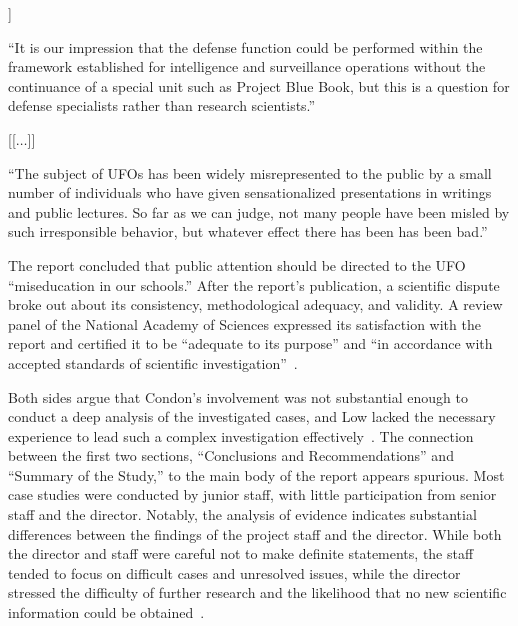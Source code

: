 \begin{svgraybox}
[[$\ldots$]]

``It is our impression that the defense function could be performed within the framework
established for intelligence and surveillance operations without the continuance of a special unit such as Project Blue Book,
but this is a question for defense specialists rather than research scientists.''



[[$\ldots$]]

``The subject of UFOs has been widely misrepresented to the public by a small number of individuals who have given sensationalized presentations
in writings and public lectures.
So far as we can judge, not many people have been misled by such irresponsible behavior,
but whatever effect there has been has been bad.''
\end{svgraybox}

The report concluded that public attention should be directed to the UFO ``miseducation in our schools.'' After the report's publication, a scientific dispute broke out about its consistency, methodological adequacy, and validity. A review panel of the National Academy of Sciences expressed its satisfaction with the report and certified it to be ``adequate to its purpose'' and ``in accordance with accepted standards of scientific investigation''~\cite{PNAS-Condon-1969}.

Both sides argue that Condon's involvement was not substantial enough to conduct a deep analysis of the investigated cases, and Low lacked the necessary experience to lead such a complex investigation effectively~\cite{Klass2019Apr}. The connection between the first two sections, ``Conclusions and Recommendations'' and ``Summary of the Study,'' to the main body of the report appears spurious. Most case studies were conducted by junior staff, with little participation from senior staff and the director. Notably, the analysis of evidence indicates substantial differences between the findings of the project staff and the director. While both the director and staff were careful not to make definite statements, the staff tended to focus on difficult cases and unresolved issues, while the director stressed the difficulty of further research and the likelihood that no new scientific information could be obtained~\cite{Sturrock-Condon-87}.

